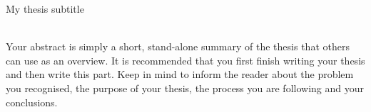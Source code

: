 \begin{center}
    \Large
    
    \vspace{0.4cm}
    \large
    My thesis subtitle
    
    \vspace{0.4cm}
    
    \vspace{1.5cm}
\\
\vspace{25mm}
Your abstract is simply a short, stand-alone summary of the thesis that others can use as an overview. It is recommended that you first finish writing your thesis and then write this part. Keep in mind to inform the reader about the problem you recognised, the purpose of your thesis, the process you are following and your conclusions.
\end{center}